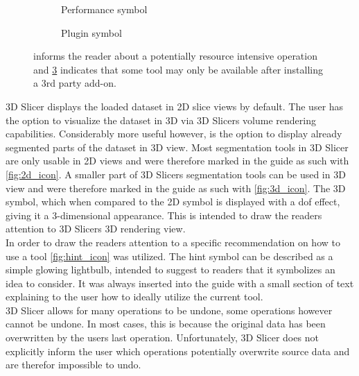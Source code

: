 \begin{figure}[h!]
	\begin{centering}
		\begin{subfigure}{0.5\textwidth}
			
			\caption{Performance symbol}
			\label{fig:performance_icon}
		\end{subfigure}
		\begin{subfigure}{0.5\textwidth}
			
			\caption{Plugin symbol}
			\label{fig:plugin_icon}
		\end{subfigure}
	\end{centering}
	\caption{ informs the reader about a potentially resource intensive operation and \cref{fig:plugin_icon} indicates that some tool may only be available after installing a 3rd party add-on.}
\end{figure}
\par\medskip
\noindent
3D Slicer displays the loaded dataset in 2D slice views by default.
The user has the option to visualize the dataset in 3D via 3D Slicers volume rendering capabilities.
Considerably more useful however, is the option to display already segmented parts of the dataset in 3D view.
Most segmentation tools in 3D Slicer are only usable in 2D views and were therefore marked in the guide as such with \cref{fig:2d_icon}.
A smaller part of 3D Slicers segmentation tools can be used in 3D view and were therefore marked in the guide as such with \cref{fig:3d_icon}.
The 3D symbol, which when compared to the 2D symbol is displayed with a \acrfull{dof} effect, giving it a 3-dimensional appearance.
This is intended to draw the readers attention to 3D Slicers 3D rendering view.\\
In order to draw the readers attention to a specific recommendation on how to use a tool \cref{fig:hint_icon} was utilized.
The hint symbol can be described as a simple glowing lightbulb, intended to suggest to readers that it symbolizes an idea to consider.
It was always inserted into the guide with a small section of text explaining to the user how to ideally utilize the current tool.\\
3D Slicer allows for many operations to be undone, some operations however cannot be undone.
In most cases, this is because the original data has been overwritten by the users last operation.
Unfortunately, 3D Slicer does not explicitly inform the user which operations potentially overwrite source data and are therefor impossible to undo.
